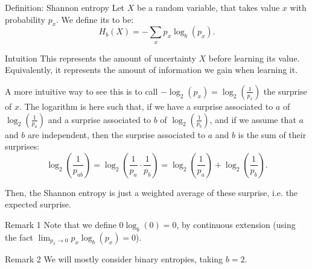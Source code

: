 \documentclass[a4paper]{article}
\begin{document}
\begin{parag}{Definition: Shannon entropy}
    Let $X$ be a random variable, that takes value $x$ with probability $p_x$. We define its  to be: 
    \[H_b\left(X\right) = - \sum_{x} p_x \log_{b}\left(p_x\right).\]

    \begin{subparag}{Intuition}
        This represents the amount of uncertainty $X$ before learning its value. Equivalently, it represents the amount of information we gain when learning it.

        A more intuitive way to see this is to call $-\log_{2}\left(p_x\right) = \log_2\left(\frac{1}{p_x}\right)$ the surprise of $x$. The logarithm is here such that, if we have a surprise associated to $a$ of $\log_{2}\left(\frac{1}{p_a}\right)$ and a surprise associated to $b$ of $\log_{2}\left(\frac{1}{p_b}\right)$, and if we assume that $a$ and $b$ are independent, then the surprise associated to $a$ and $b$ is the sum of their surprises:
        \[\log_2\left(\frac{1}{p_{ab}}\right) = \log_2\left(\frac{1}{p_a}\cdot \frac{1}{p_b}\right) = \log_{2}\left(\frac{1}{p_a}\right) + \log_{2}\left(\frac{1}{p_b}\right).\]

        Then, the Shannon entropy is just a weighted average of these surprise, i.e. the expected surprise.
    \end{subparag}
    
    \begin{subparag}{Remark 1}
        Note that we define $0 \log_{b}\left(0\right) = 0$, by continuous extension (using the fact $\lim_{p_x \to 0} p_x \log_{b}\left(p_x\right) = 0$).
    \end{subparag}

    \begin{subparag}{Remark 2}
        We will mostly consider binary entropies, taking $b = 2$.
    \end{subparag}
\end{parag}
\end{document}
